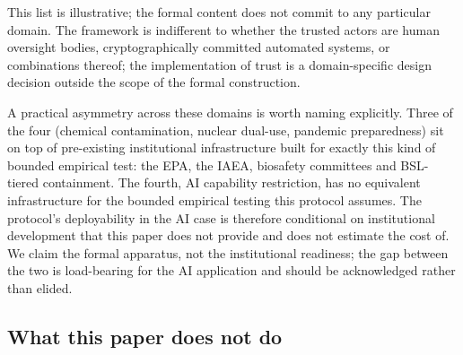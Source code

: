 This list is illustrative; the formal content does not commit to
any particular domain.  The framework is indifferent to whether
the trusted actors are human oversight bodies, cryptographically
committed automated systems, or combinations thereof; the
implementation of trust is a domain-specific design decision
outside the scope of the formal construction.

A practical asymmetry across these domains is worth naming
explicitly.  Three of the four (chemical contamination, nuclear
dual-use, pandemic preparedness) sit on top of pre-existing
institutional infrastructure built for exactly this kind of
bounded empirical test: the EPA, the IAEA, biosafety committees
and BSL-tiered containment.  The fourth, AI capability
restriction, has no equivalent infrastructure for the
bounded empirical testing this protocol assumes.  The
protocol's deployability in the AI case is therefore conditional
on institutional development that this paper does not provide and
does not estimate the cost of.  We claim the formal apparatus, not
the institutional readiness; the gap between the two is
load-bearing for the AI application and should be acknowledged
rather than elided.

\subsection{What this paper does not do}
\label{sec:not_do}


